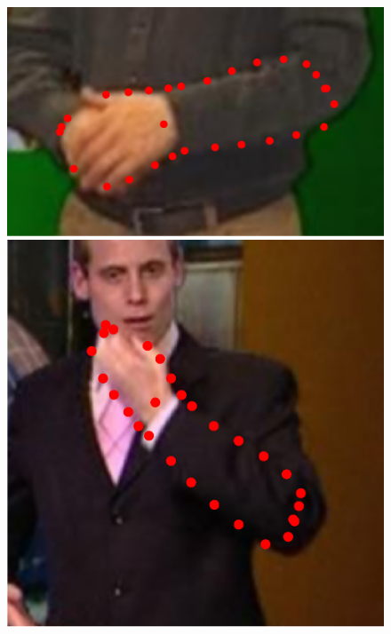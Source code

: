 \begin{figure}[t!]
    \includegraphics[height=\ofh]{resources/Fittings/3.eps}
    \includegraphics[height=\ofh]{resources/Fittings/4.eps}

\end{figure}
